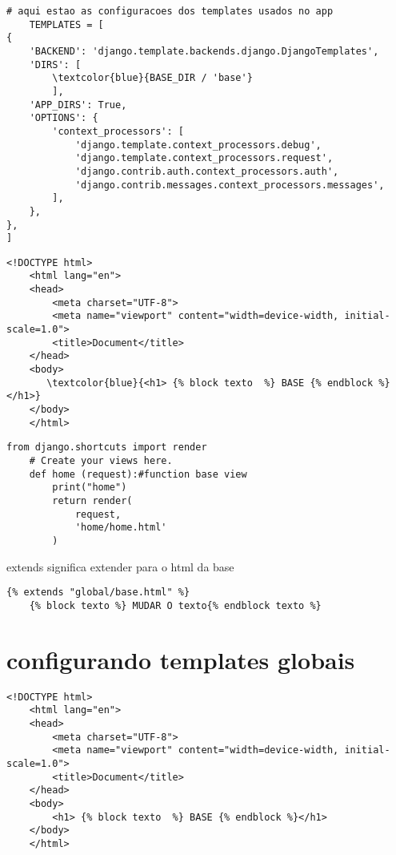 \documentclass{article}
\begin{document}
\begin{lstlisting}[style=pythonStyle, caption={project/settings.py}]
    # aqui estao as configuracoes dos templates usados no app
    TEMPLATES = [
{
    'BACKEND': 'django.template.backends.django.DjangoTemplates',
    'DIRS': [
        \textcolor{blue}{BASE_DIR / 'base'}
        ],
    'APP_DIRS': True,
    'OPTIONS': {
        'context_processors': [
            'django.template.context_processors.debug',
            'django.template.context_processors.request',
            'django.contrib.auth.context_processors.auth',
            'django.contrib.messages.context_processors.messages',
        ],
    },
},
]
\end{lstlisting}



\begin{lstlisting}[style=djangohtml, caption={base/global/base.html}]
    <!DOCTYPE html>
    <html lang="en">
    <head>
        <meta charset="UTF-8">
        <meta name="viewport" content="width=device-width, initial-scale=1.0">
        <title>Document</title>
    </head>
    <body>
       \textcolor{blue}{<h1> {% block texto  %} BASE {% endblock %}</h1>} 
    </body>
    </html>
\end{lstlisting}

\begin{lstlisting}[style=djangohtml, caption={home/views.py}]
    from django.shortcuts import render
    # Create your views here.
    def home (request):#function base view
        print("home")
        return render(
            request,
            'home/home.html'
        )

\end{lstlisting}
extends significa extender para o html da base

\begin{lstlisting}[style=djangohtml, caption={home/templates/home.html}]
    {% extends "global/base.html" %}
    {% block texto %} MUDAR O texto{% endblock texto %}

\end{lstlisting}

\section{configurando templates globais}

\begin{lstlisting}[style=djangohtml, caption={base/global/base.html}]
    <!DOCTYPE html>
    <html lang="en">
    <head>
        <meta charset="UTF-8">
        <meta name="viewport" content="width=device-width, initial-scale=1.0">
        <title>Document</title>
    </head>
    <body>
        <h1> {% block texto  %} BASE {% endblock %}</h1>
    </body>
    </html>
\end{lstlisting}
\end{document}
